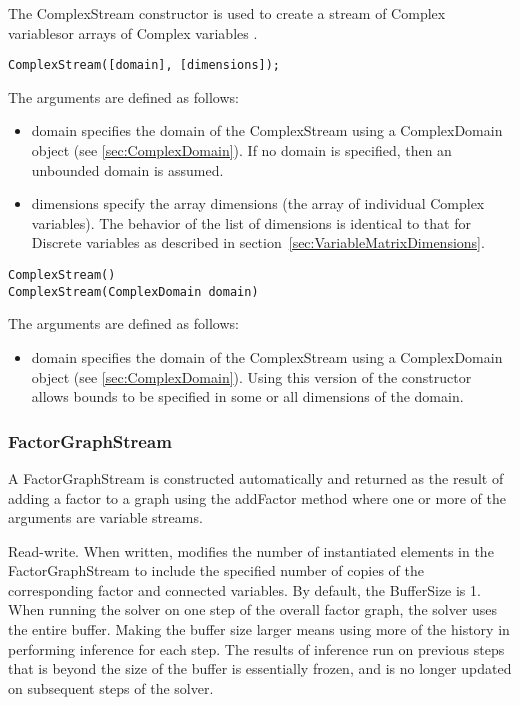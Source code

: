 
The ComplexStream constructor is used to create a stream of Complex variables\ifmatlab or arrays of Complex variables \fi.

\ifmatlab
\begin{lstlisting}
ComplexStream([domain], [dimensions]);
\end{lstlisting}

The arguments are defined as follows:

\begin{itemize}
\item domain specifies the domain of the ComplexStream using a ComplexDomain object (see \ref{sec:ComplexDomain}).  If no domain is specified, then an unbounded domain is assumed.
\item dimensions specify the array dimensions (the array of individual Complex variables).  The behavior of the list of dimensions is identical to that for Discrete variables as described in section~\ref{sec:VariableMatrixDimensions}.
\end{itemize}
\fi

\ifjava
\begin{lstlisting}
ComplexStream()
ComplexStream(ComplexDomain domain)
\end{lstlisting}

The arguments are defined as follows:

\begin{itemize}
\item domain specifies the domain of the ComplexStream using a ComplexDomain object (see \ref{sec:ComplexDomain}).  Using this version of the constructor allows bounds to be specified in some or all dimensions of the domain.
\end{itemize}
\fi



\subsubsection{FactorGraphStream}

A FactorGraphStream is constructed automatically and returned as the result of adding a factor to a graph using the addFactor method where one or more of the arguments are variable streams.


\label{sec:FactorGraphStream.BufferSize}

Read-write. When written, modifies the number of instantiated elements in the FactorGraphStream to include the specified number of copies of the corresponding factor and connected variables.  By default, the BufferSize is 1.  When running the solver on one step of the overall factor graph, the solver uses the entire buffer.  Making the buffer size larger means using more of the history in performing inference for each step.  The results of inference run on previous steps that is beyond the size of the buffer is essentially frozen, and is no longer updated on subsequent steps of the solver.


